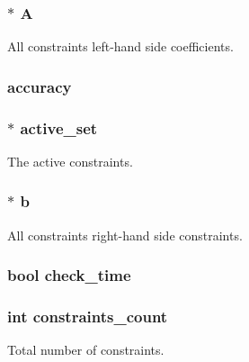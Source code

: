 \subsubsection[{A}]{$\ast$ A}\label{structproblem_ac56453eb618f2ce98f20d91442a5690b}
All constraints left-\/hand side coefficients. \hypertarget{structproblem_abb02aa4aa436e037d8c806b2364cf97c}{}
\subsubsection[{accuracy}]{ accuracy}\label{structproblem_abb02aa4aa436e037d8c806b2364cf97c}
\hypertarget{structproblem_a27b8b36dc36cb3620e52c6275d0bb87b}{}
\subsubsection[{active\+\_\+set}]{$\ast$ active\+\_\+set}\label{structproblem_a27b8b36dc36cb3620e52c6275d0bb87b}
The active constraints. \hypertarget{structproblem_a844487a6c95b5fd7a6c768f5fdaa24c0}{}
\subsubsection[{b}]{$\ast$ b}\label{structproblem_a844487a6c95b5fd7a6c768f5fdaa24c0}
All constraints right-\/hand side constraints. \hypertarget{structproblem_afb90fd1d52b36f4f03af3b09f7679bd8}{}
\subsubsection[{check\+\_\+time}]{\setlength{\rightskip}{0pt plus 5cm}bool check\+\_\+time}\label{structproblem_afb90fd1d52b36f4f03af3b09f7679bd8}
\hypertarget{structproblem_af4bd8be9dbe65720b067dc893e57481a}{}
\subsubsection[{constraints\+\_\+count}]{\setlength{\rightskip}{0pt plus 5cm}int constraints\+\_\+count}\label{structproblem_af4bd8be9dbe65720b067dc893e57481a}
Total number of constraints. \hypertarget{structproblem_a1fc7c4b0ad7cae12ae26a243648cec36}{}

